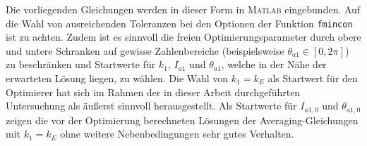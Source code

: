 Die vorliegenden Gleichungen werden in dieser Form in \textsc{Matlab} eingebunden.
Auf die Wahl von ausreichenden Toleranzen bei den Optionen der Funktion \texttt{fmincon} ist zu achten.
Zudem ist es sinnvoll die freien Optimierungsparameter durch obere und untere Schranken auf gewisse Zahlenbereiche (beispielsweise $\theta_{a1} \in [0, 2\pi]$) zu beschränken 
und Startwerte für $k_1$, $I_{a1}$ und $\theta_{a1}$, welche in der Nähe der erwarteten Lösung liegen,  zu wählen. 
Die Wahl von $k_1=k_E$ als Startwert für den Optimierer hat sich im Rahmen der in dieser Arbeit durchgeführten Untersuchung als äußerst sinnvoll herausgestellt. 
Als Startwerte für $I_{a1,0}$ und $\theta_{a1,0}$ zeigen die vor der Optimierung berechneten 
Lösungen  der Averaging-Gleichungen   mit $k_1=k_E$  ohne weitere Nebenbedingungen
sehr gutes Verhalten.




%
%
%
